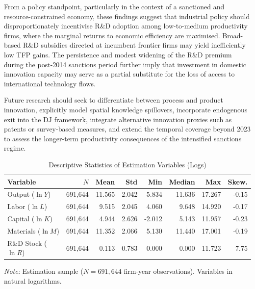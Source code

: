 \documentclass[a4paper, 12pt]{article}
\begin{document}
From a policy standpoint, particularly in the context of a sanctioned and resource-constrained economy, these findings suggest that industrial policy should disproportionately incentivise R\&D adoption among low-to-medium productivity firms, where the marginal returns to economic efficiency are maximised. Broad-based R\&D subsidies directed at incumbent frontier firms may yield inefficiently low TFP gains. The persistence and modest widening of the R\&D premium during the post-2014 sanctions period further imply that investment in domestic innovation capacity may serve as a partial substitute for the loss of access to international technology flows.

Future research should seek to differentiate between process and product innovation, explicitly model spatial knowledge spillovers, incorporate endogenous exit into the DJ framework, integrate alternative innovation proxies such as patents or survey-based measures, and extend the temporal coverage beyond 2023 to assess the longer-term productivity consequences of the intensified sanctions regime.


\nocite{*}
\printbibliography[title={References}]

\begin{table}[htbp]
\centering
\caption{Descriptive Statistics of Estimation Variables (Logs)}
\label{tab:desc_log}
\begin{tabular}{lrrrrrrr}
\toprule
Variable & $N$ & Mean & Std & Min & Median & Max & Skew. \\
\midrule
  Output ($\ln Y$) & 691,644 & 11.565 & 2.042 & 5.834 & 11.636 & 17.267 & -0.15 \\
  Labor ($\ln L$) & 691,644 & 9.515 & 2.045 & 4.060 & 9.648 & 14.920 & -0.17 \\
  Capital ($\ln K$) & 691,644 & 4.944 & 2.626 & -2.012 & 5.143 & 11.957 & -0.23 \\
  Materials ($\ln M$) & 691,644 & 11.352 & 2.066 & 5.130 & 11.440 & 17.001 & -0.19 \\
  R\&D Stock ($\ln R$) & 691,644 & 0.113 & 0.783 & 0.000 & 0.000 & 11.723 & 7.75 \\
\bottomrule
\end{tabular}
\begin{flushleft}
\footnotesize
\textit{Note:} Estimation sample ($N = 691,644$ firm-year observations).
Variables in natural logarithms.
\end{flushleft}
\end{table}
\end{document}
